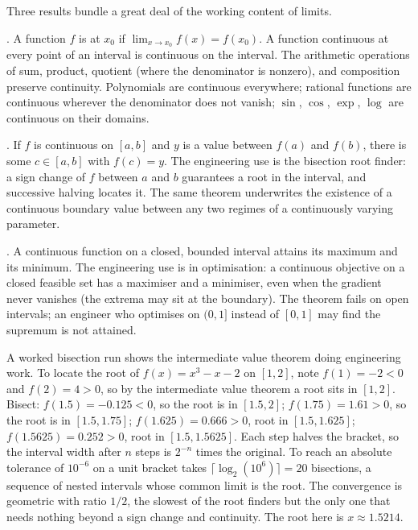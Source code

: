 Three results bundle a great deal of the working content of limits.

. A function $f$ is  at $x_{0}$
if $\lim_{x \to x_{0}} f(x) = f(x_{0})$. A function continuous at every
point of an interval is continuous on the interval. The arithmetic
operations of sum, product, quotient (where the denominator is
nonzero), and composition preserve continuity. Polynomials are
continuous everywhere; rational functions are continuous wherever the
denominator does not vanish; $\sin$, $\cos$, $\exp$, $\log$ are
continuous on their domains.

. If $f$ is continuous on $[a, b]$
and $y$ is a value between $f(a)$ and $f(b)$, there is some
$c \in [a, b]$ with $f(c) = y$. The engineering use is the bisection
root finder: a sign change of $f$ between $a$ and $b$ guarantees a
root in the interval, and successive halving locates it. The same
theorem underwrites the existence of a continuous boundary value
between any two regimes of a continuously varying parameter.

. A continuous function on a closed,
bounded interval attains its maximum and its minimum. The engineering
use is in optimisation: a continuous objective on a closed feasible
set has a maximiser and a minimiser, even when the gradient never
vanishes (the extrema may sit at the boundary). The theorem fails on
open intervals; an engineer who optimises on $(0, 1]$ instead of
$[0, 1]$ may find the supremum is not attained.

A worked bisection run shows the intermediate value theorem doing
engineering work. To locate the root of $f(x) = x^{3} - x - 2$ on
$[1, 2]$, note $f(1) = -2 < 0$ and $f(2) = 4 > 0$, so by the
intermediate value theorem a root sits in $[1, 2]$. Bisect: $f(1.5) =
-0.125 < 0$, so the root is in $[1.5, 2]$; $f(1.75) = 1.61 > 0$, so the
root is in $[1.5, 1.75]$; $f(1.625) = 0.666 > 0$, root in $[1.5,
1.625]$; $f(1.5625) = 0.252 > 0$, root in $[1.5, 1.5625]$. Each step
halves the bracket, so the interval width after $n$ steps is
$2^{-n}$ times the original. To reach an absolute tolerance of
$10^{-6}$ on a unit bracket takes $\lceil \log_{2}(10^{6}) \rceil = 20$
bisections, a sequence of nested intervals whose common limit is the
root. The convergence is geometric with ratio $1/2$, the slowest of the
root finders but the only one that needs nothing beyond a sign change
and continuity. The root here is $x \approx 1.5214$.

